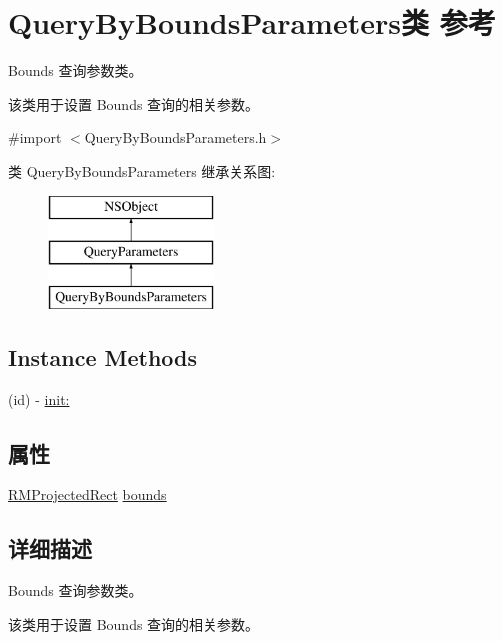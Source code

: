 \hypertarget{interface_query_by_bounds_parameters}{\section{Query\-By\-Bounds\-Parameters类 参考}
\label{interface_query_by_bounds_parameters}
}


Bounds 查询参数类。\par
 该类用于设置 Bounds 查询的相关参数。  




{\ttfamily \#import $<$Query\-By\-Bounds\-Parameters.\-h$>$}

类 Query\-By\-Bounds\-Parameters 继承关系图\-:\begin{figure}[H]
\begin{center}
\leavevmode
\includegraphics[height=3.000000cm]{interface_query_by_bounds_parameters}
\end{center}
\end{figure}
\subsection*{Instance Methods}
\begin{DoxyCompactItemize}
\item 
(id) -\/ \hyperlink{interface_query_by_bounds_parameters_acb773dfd68fb97595231ccc4eddc90f3}{init\-:}
\end{DoxyCompactItemize}
\subsection*{属性}
\begin{DoxyCompactItemize}
\item 
\hyperlink{struct_r_m_projected_rect}{R\-M\-Projected\-Rect} \hyperlink{interface_query_by_bounds_parameters_ad2e99aa8692b438342762ff18a867b6e}{bounds}
\end{DoxyCompactItemize}


\subsection{详细描述}
Bounds 查询参数类。\par
 该类用于设置 Bounds 查询的相关参数。 

